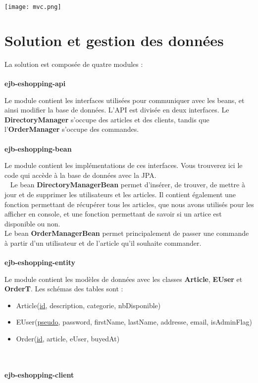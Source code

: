 \documentclass[12pt]{article}
\begin{document}
\begin{center}
\texttt{[image: mvc.png]}
\end{center}

\newpage
\section{Solution et gestion des données}

La solution est composée de quatre modules :
\\ \\
\textbf{ejb-eshopping-api}

Le module contient les interfaces utilisées pour communiquer avec les beans, et ainsi modifier la base de données.
L'API est divisée en deux interfaces. Le \textbf{DirectoryManager} s'occupe des articles et des clients, tandis que l'\textbf{OrderManager} s'occupe des commandes. \\ \\
\textbf{ejb-eshopping-bean}

Le module contient les implémentations de ces interfaces. Vous trouverez ici le code qui accède à la base de données avec la JPA. \\ 
Le bean \textbf{DirectoryManagerBean} permet d'insérer, de trouver, de mettre à jour et de supprimer les utilisateurs et les articles. Il contient également une fonction permettant de récupérer tous les articles, que nous avons utilisés pour les afficher en console, et une fonction permettant de savoir si un artice est disponible ou non.\\
Le bean \textbf{OrderManagerBean} permet principalement de passer une commande à partir d'un utilisateur et de l'article qu'il souhaite commander.\\ \\
\textbf{ejb-eshopping-entity}

Le module contient les modèles de données avec les classes \textbf{Article}, \textbf{EUser} et \textbf{OrderT}.
Les schémas des tables sont :
\begin{itemize}
  \item Article(\underline{id}, description, categorie, nbDisponible)
  \item EUser(\underline{pseudo}, password, firstName, lastName, addresse, email, isAdminFlag)
  \item Order(\underline{id}, article, eUser, buyedAt)
\end{itemize}

\\ \\
\textbf{ejb-eshopping-client}
\end{document}
